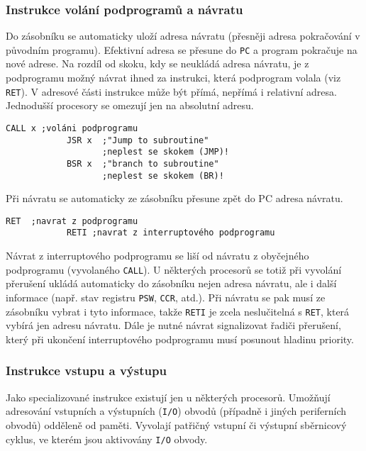         \subsubsection{Instrukce volání podprogramů a návratu} 
          Do zásobníku se automaticky uloží adresa návratu (přesněji adresa pokračování v původním 
          programu). Efektivní adresa se přesune do \texttt{PC} a program pokračuje na nové adrese. 
          Na rozdíl od skoku, kdy se neukládá adresa návratu, je z podprogramu možný návrat ihned 
          za instrukci, která podprogram volala (viz \texttt{RET}). V adresové části instrukce může 
          být přímá, nepřímá i relativní adresa. 
          Jednodušší procesory se omezují jen na absolutní adresu.
          \begin{lstlisting}[gobble=10]
            CALL x ;voláni podprogramu
            JSR x  ;"Jump to subroutine"
                   ;neplest se skokem (JMP)!
            BSR x  ;"branch to subroutine" 
                   ;neplest se skokem (BR)!
          \end{lstlisting}
          Při návratu se automaticky ze zásobníku přesune zpět do PC adresa návratu.
          \begin{lstlisting}[gobble=10]
            RET  ;navrat z podprogramu
            RETI ;navrat z interruptového podprogramu
          \end{lstlisting}
          
          Návrat z interruptového podprogramu se liší od návratu z obyčejného podprogramu 
          (vyvolaného \texttt{CALL}). U některých procesorů se totiž při vyvolání přerušení ukládá 
          automaticky do zásobníku nejen adresa návratu, ale i další informace (např. stav registru 
          \texttt{PSW}, \texttt{CCR}, atd.). Při návratu se pak musí ze zásobníku vybrat i tyto 
          informace, takže \texttt{RETI} je zcela neslučitelná s \texttt{RET}, která vybírá jen 
          adresu návratu. Dále je nutné návrat signalizovat řadiči přerušení, který při ukončení 
          interruptového podprogramu musí posunout hladinu priority.
          
        \subsubsection{Instrukce vstupu a výstupu}
          Jako specializované instrukce existují jen u některých procesorů. Umožňují adresování 
          vstupních a výstupních (\texttt{I/O}) obvodů (případně i jiných periferních obvodů) 
          odděleně od paměti. Vyvolají patřičný vstupní či výstupní sběrnicový cyklus, ve kterém 
          jsou aktivovány \texttt{I/O} obvody.
          
